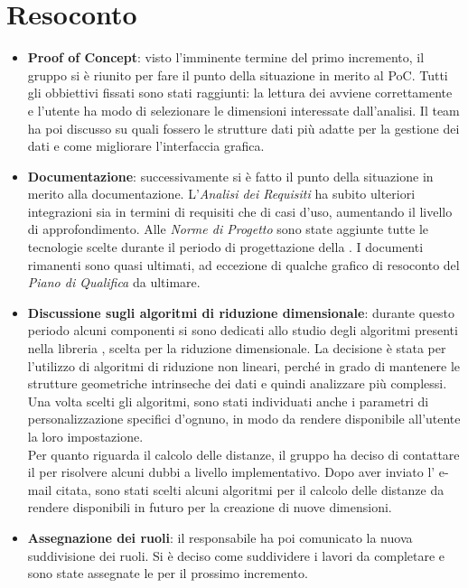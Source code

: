 \section{Resoconto}
\begin{itemize}
\item \textbf{Proof of Concept}: visto l'imminente termine del primo incremento, il gruppo si è riunito per fare il punto della situazione in merito al PoC. Tutti gli obbiettivi fissati sono stati raggiunti: la lettura dei  avviene correttamente e l'utente ha modo di selezionare le dimensioni interessate dall'analisi. Il team ha poi discusso su quali fossero le strutture dati più adatte per la gestione dei dati e come migliorare l'interfaccia grafica. 

\item\textbf{Documentazione}: successivamente si è fatto il punto della situazione in merito alla documentazione. L'\textit{Analisi dei Requisiti} ha subito ulteriori integrazioni sia in termini di requisiti che di casi d'uso, aumentando il livello di approfondimento. Alle \textit{Norme di Progetto} sono state aggiunte tutte le tecnologie scelte durante il periodo di progettazione della . I documenti rimanenti sono quasi ultimati, ad eccezione di qualche grafico di resoconto del \textit{Piano di Qualifica} da ultimare.

\item\textbf{Discussione sugli algoritmi di riduzione dimensionale}: durante questo periodo alcuni componenti si sono dedicati allo studio degli algoritmi presenti nella libreria , scelta per la riduzione dimensionale. La decisione è stata per l'utilizzo di algoritmi di riduzione non lineari, perché in grado di mantenere le strutture geometriche intrinseche dei dati e quindi analizzare  più complessi. Una volta scelti gli algoritmi, sono stati individuati anche i parametri di personalizzazione specifici d'ognuno, in modo da rendere disponibile all'utente la loro impostazione.\\ Per quanto riguarda il calcolo delle distanze, il gruppo ha deciso di contattare il  per risolvere alcuni dubbi a livello implementativo. Dopo aver inviato l' e-mail citata, sono stati scelti alcuni algoritmi per il calcolo delle distanze da rendere disponibili in futuro per la creazione di nuove dimensioni.

\item \textbf{Assegnazione dei ruoli}: il responsabile ha poi comunicato la nuova suddivisione dei ruoli. Si è deciso come suddividere i lavori da completare e sono state assegnate le  per il prossimo incremento.
\end{itemize}

\newpage